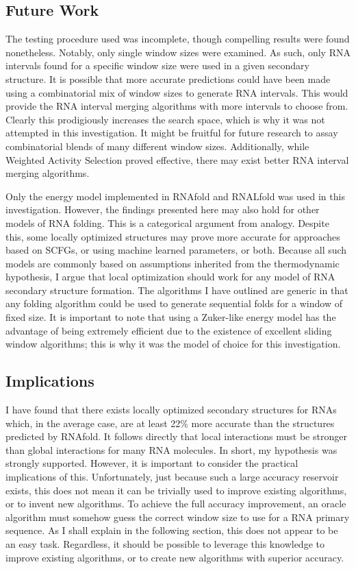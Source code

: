 \documentclass{cshonours}
\begin{document}
\subsection{Future Work}

The testing procedure used was incomplete, though compelling results were found nonetheless. Notably, only single window sizes were examined. As such, only RNA intervals found for a specific window size were used in a given secondary structure. It is possible that more accurate predictions could have been made using a combinatorial mix of window sizes to generate RNA intervals. This would provide the RNA interval merging algorithms with more intervals to choose from. Clearly this prodigiously increases the search space, which is why it was not attempted in this investigation. It might be fruitful for future research to assay combinatorial blends of many different window sizes. Additionally, while Weighted Activity Selection proved effective, there may exist better RNA interval merging algorithms.

Only the energy model implemented in RNAfold and RNALfold was used in this investigation. However, the findings presented here may also hold for other models of RNA folding. This is a categorical argument from analogy. Despite this, some locally optimized structures may prove more accurate for approaches based on SCFGs, or using machine learned parameters, or both. Because all such models are commonly based on assumptions inherited from the thermodynamic hypothesis, I argue that local optimization should work for any model of RNA secondary structure formation. The algorithms I have outlined are generic in that any folding algorithm could be used to generate sequential folds for a window of fixed size. It is important to note that using a Zuker-like energy model has the advantage of being extremely efficient due to the existence of excellent sliding window algorithms; this is why it was the model of choice for this investigation.

\subsection{Implications}

I have found that there exists locally optimized secondary structures for RNAs which, in the average case, are at least 22\% more accurate than the structures predicted by RNAfold. It follows directly that local interactions must be stronger than global interactions for many RNA molecules. In short, my hypothesis was strongly supported. However, it is important to consider the practical implications of this. Unfortunately, just because such a large accuracy reservoir exists, this does not mean it can be trivially used to improve existing algorithms, or to invent new algorithms. To achieve the full accuracy improvement, an oracle algorithm must somehow guess the correct window size to use for a RNA primary sequence. As I shall explain in the following section, this does not appear to be an easy task. Regardless, it should be possible to leverage this knowledge to improve existing algorithms, or to create new algorithms with superior accuracy. 
\end{document}
